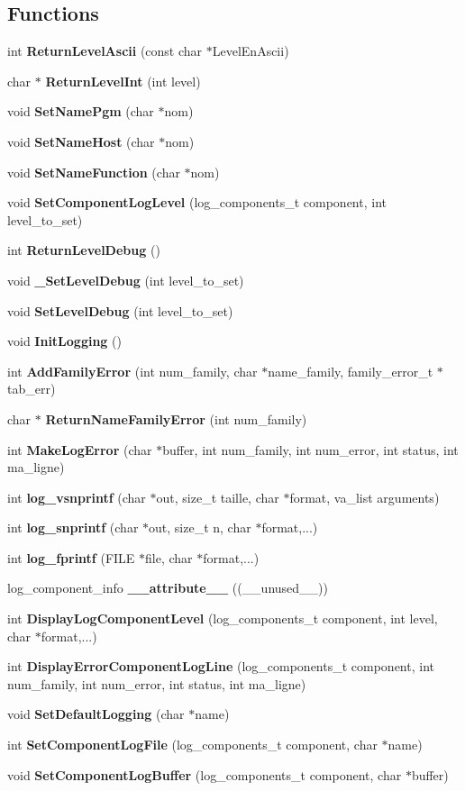 \subsection*{Functions}
\begin{DoxyCompactItemize}
\item 
int {\bf ReturnLevelAscii} (const char $\ast$LevelEnAscii)
\item 
char $\ast$ {\bf ReturnLevelInt} (int level)
\item 
void {\bf SetNamePgm} (char $\ast$nom)
\item 
void {\bf SetNameHost} (char $\ast$nom)
\item 
void {\bf SetNameFunction} (char $\ast$nom)
\item 
void {\bf SetComponentLogLevel} (log\_\-components\_\-t component, int level\_\-to\_\-set)
\item 
int {\bf ReturnLevelDebug} ()
\item 
void {\bf \_\-SetLevelDebug} (int level\_\-to\_\-set)
\item 
void {\bf SetLevelDebug} (int level\_\-to\_\-set)
\item 
void {\bf InitLogging} ()
\item 
int {\bf AddFamilyError} (int num\_\-family, char $\ast$name\_\-family, family\_\-error\_\-t $\ast$tab\_\-err)
\item 
char $\ast$ {\bf ReturnNameFamilyError} (int num\_\-family)
\item 
int {\bf MakeLogError} (char $\ast$buffer, int num\_\-family, int num\_\-error, int status, int ma\_\-ligne)
\item 
int {\bf log\_\-vsnprintf} (char $\ast$out, size\_\-t taille, char $\ast$format, va\_\-list arguments)
\item 
int {\bf log\_\-snprintf} (char $\ast$out, size\_\-t n, char $\ast$format,...)
\item 
int {\bf log\_\-fprintf} (FILE $\ast$file, char $\ast$format,...)
\item 
log\_\-component\_\-info {\bf \_\-\_\-attribute\_\-\_\-} ((\_\-\_\-unused\_\-\_\-))
\item 
int {\bf DisplayLogComponentLevel} (log\_\-components\_\-t component, int level, char $\ast$format,...)
\item 
int {\bf DisplayErrorComponentLogLine} (log\_\-components\_\-t component, int num\_\-family, int num\_\-error, int status, int ma\_\-ligne)
\item 
void {\bf SetDefaultLogging} (char $\ast$name)
\item 
int {\bf SetComponentLogFile} (log\_\-components\_\-t component, char $\ast$name)
\item 
void {\bf SetComponentLogBuffer} (log\_\-components\_\-t component, char $\ast$buffer)
\end{DoxyCompactItemize}
